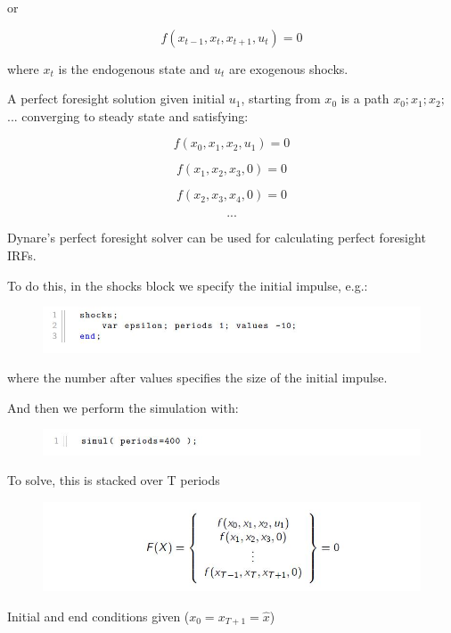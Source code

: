 \documentclass[cn,10pt,math=newtx,citestyle=gb7714-2015,bibstyle=gb7714-2015]{elegantbook}
\begin{document}
or

$$f(x_{t-1},x_t,x_{t+1},u_t)=0$$

where $x_t$ is the endogenous state and $u_t$ are exogenous shocks.

A perfect foresight solution given initial $u_1$, starting from $x_0$ is a path $x_0; x_1; x_2;$ ... converging to steady state and satisfying:

$$f(x_0,x_1,x_2,u_1)=0$$

$$f(x_1,x_2,x_3,0)=0$$

$$f(x_2,x_3,x_4,0)=0$$

$$...$$

Dynare's perfect foresight solver can be used for calculating perfect foresight IRFs.

To do this, in the shocks block we specify the initial impulse, e.g.:

\begin{figure}[htbp!]
	\centering
	\includegraphics[width=0.8\linewidth]{FIG/extendpath}
	\centering
\end{figure}

where the number after values specifies the size of the initial impulse.

And then we perform the simulation with:

\begin{figure}[htbp!]
	\centering
	\includegraphics[width=0.8\linewidth]{FIG/runsimul}
	\centering
\end{figure}

To solve, this is stacked over T periods

\begin{figure}[htbp!]
	\centering
	\includegraphics[width=0.8\linewidth]{FIG/equationsexpath}
	\centering
\end{figure}

Initial and end conditions given ($x_0 = x_{T+1}= \hat{x}$)
\end{document}
